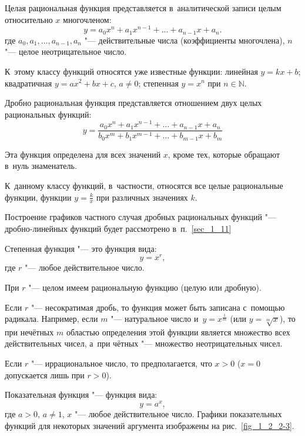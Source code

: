 Целая рациональная функция представляется в~аналитической записи целым
относительно $x$ многочленом:
\begin{equation*}
y = a_{0}x^{n} + a_{1}x^{n-1} + \ldots + a_{n-1}x + a_{n} .
\end{equation*}
где $a_{0}, a_{1}, \dots, a_{n-1}, a_{n}$ "--- действительные числа
(коэффициенты многочлена),
$n$ "--- целое неотрицательное число.

К~этому классу функций относятся уже известные функции:
линейная $y = kx + b$;
квадратичная $y = ax^{2} + bx + c$, $a \ne 0$;
степенная $y = x^{n}$ при $n \in \mathbb{N}$.

Дробно рациональная функция представляется отношением двух целых рациональных
функций:
\begin{equation*}
y = 
\frac
{a_{0}x^{n} + a_{1}x^{n-1} + \ldots + a_{n-1}x + a_{n}}
{b_{0}x^{m} + b_{1}x^{m-1} + \ldots + b_{m-1}x + b_{m}}
\end{equation*}

Эта функция определена для всех значений $x$, кроме тех,
которые обращают в~нуль знаменатель.

К~данному классу функций, в~частности, относятся все целые рациональные функции,
функции $\displaystyle y = \frac{k}{x}$ при различных значениях $k$.

Построение графиков частного случая дробных рациональных функций "---
дробно-линейных функций будет рассмотрено в~п.\ \ref{sec_1_11}

Степенная функция "--- это функция вида:
\begin{equation*}
y = x^{r},
\end{equation*}
где $r$ "--- любое действительное число.

При $r$ "--- целом имеем рациональную функцию (целую или дробную).

Если $r$ "--- несократимая дробь, то функция может быть записана с~помощью радикала.
Например, если $m$ "--- натуральное число и~$\displaystyle y = x^{\frac{1}{m}}$
(или $y = \sqrt[m]{x}$), то при нечётных $m$ областью определения этой функции
является множество всех действительных чисел, а~при чётных "--- множество
неотрицательных чисел.

Если $r$ "--- иррациональное число, то предполагается, что $x>0$
($x=0$ допускается лишь при $r>0$).

Показательная функция "--- функция вида:
\begin{equation*}
y = a^{x},
\end{equation*}
где $a>0$, $a \ne 1$, $x$ "--- любое действительное число.
Графики показательных функций для некоторых значений аргумента изображены
на рис.\ \ref{fig_1_2_2-3}.

